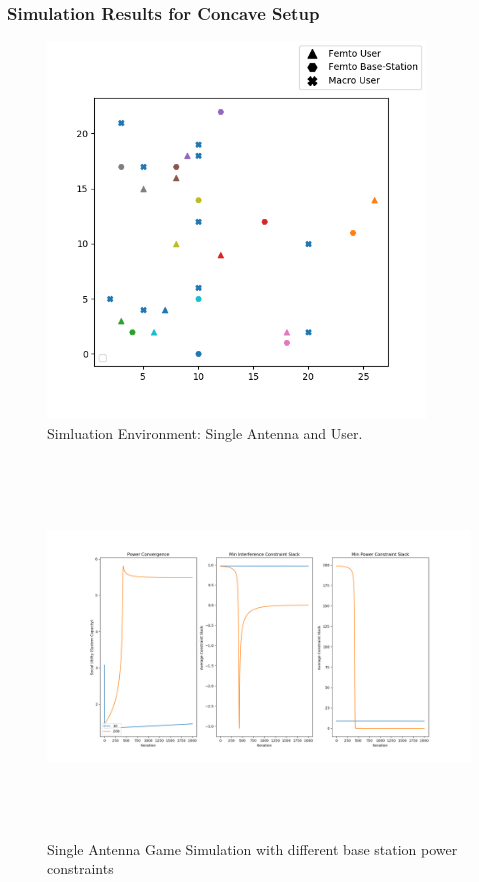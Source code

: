 \documentclass[12pt,a4paper]{report}
\begin{document}
\subsubsection{Simulation Results for Concave Setup}

\begin{figure}[H]
	\includegraphics[width=\textwidth,height = 10cm]{figures/system_figure_single}
	  \caption{Simluation Environment: Single Antenna and User.}
\end{figure}

\begin{figure}[H]
	\includegraphics[width= 15cm,height = 10cm]{figures/single_power}
	  \caption{Single Antenna Game Simulation with different base station power constraints}
\end{figure}
\end{document}
